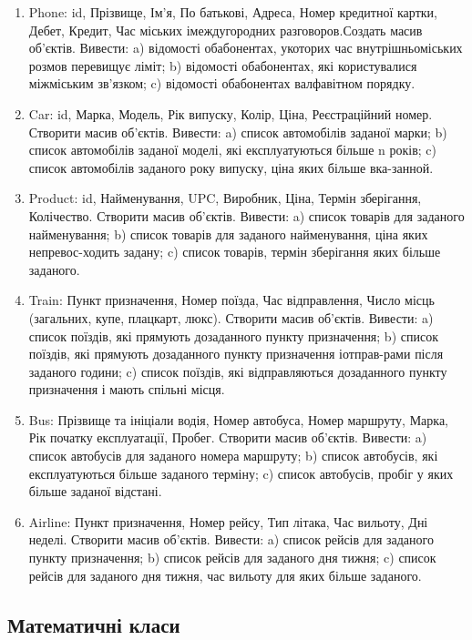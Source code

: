 \documentclass[]{article}
\begin{document}
\begin{enumerate}
\item
Phone: id, Прізвище, Ім'я, По батькові, Адреса, Номер кредитної картки, Дебет, Кредит, Час міських імеждугородних разговоров.Создать масив об'єктів. Вивести: a) відомості обабонентах, укоторих час внутрішньоміських розмов перевищує ліміт; b) відомості обабонентах, які користувалися міжміським зв'язком; c) відомості обабонентах валфавітном порядку.
\item
Car: id, Марка, Модель, Рік випуску, Колір, Ціна, Реєстраційний номер. 
Створити масив об'єктів. Вивести: a) список автомобілів заданої марки; b) список автомобілів заданої моделі, які експлуатуються більше n років; c) список автомобілів заданого року випуску, ціна яких більше вка-занной.

\item
Product: id, Найменування, UPC, Виробник, Ціна, Термін зберігання, Колічество. 
Створити масив об'єктів. Вивести: a) список товарів для заданого найменування; b) список товарів для заданого найменування, ціна яких непревос-ходить задану; c) список товарів, термін зберігання яких більше заданого.

\item Train: Пункт призначення, Номер поїзда, Час відправлення, Число місць (загальних, купе, плацкарт, люкс).
Створити масив об'єктів. 
Вивести: a) список поїздів, які прямують дозаданного пункту призначення; b) список поїздів, які прямують дозаданного пункту призначення іотправ-рами після заданого години; c) список поїздів, які відправляються дозаданного пункту призначення і мають спільні місця.

\item
Bus: Прізвище та ініціали водія, Номер автобуса, Номер маршруту, Марка, Рік початку експлуатації, Пробег.
Створити масив об'єктів. Вивести: a) список автобусів для заданого номера маршруту; b) список автобусів, які експлуатуються більше заданого терміну; c) список автобусів, пробіг у яких більше заданої відстані.

\item
Airline: Пункт призначення, Номер рейсу, Тип літака, Час вильоту, Дні неделі. Створити масив об'єктів. Вивести: a) список рейсів для заданого пункту призначення; b) список рейсів для заданого дня тижня; c) список рейсів для заданого дня тижня, час вильоту для яких більше заданого.

\end{enumerate}

\subsection{Математичні класи}
\end{document}
